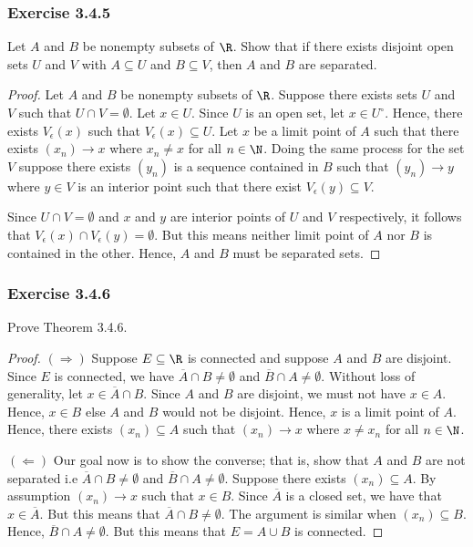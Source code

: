 \subsubsection{Exercise 3.4.5} 
Let \( A  \) and \( B  \) be nonempty subsets of \( \R  \). Show that if there exists disjoint open sets \( U  \) and \( V  \) with \( A \subseteq U  \) and \( B \subseteq V  \), then \( A  \) and \( B  \) are separated.

\begin{proof}
    Let \( A  \) and \( B  \) be nonempty subsets of \( \R  \). Suppose there exists sets \( U \) and \( V  \) such that \( U \cap V = \emptyset \). Let \( x  \in U \). Since \( U \) is an open set, let \( x \in U^{\circ} \). Hence,  there exists \( V_{\epsilon }(x) \) such that \( V_{\epsilon }(x) \subseteq U  \). Let \( x  \) be a limit point of \( A  \) such that there exists \( (x_n) \to x  \) where \( x_n \neq x  \) for all \( n \in \N  \). Doing the same process for the set \( V \) suppose there exists \( (y_n)  \) is a sequence contained in \( B  \) such that \( (y_n) \to y  \) where \( y \in V  \) is an interior point such that there exist \( V_{\epsilon }(y) \subseteq V  \).

    Since \( U \cap V = \emptyset \) and \( x  \) and \( y \) are interior points of \( U \) and \( V  \) respectively, it follows that \( V_{\epsilon }(x) \cap V_{\epsilon }(y) = \emptyset \). But this means neither limit point of \(A \) nor \( B \) is contained in the other. Hence, \( A  \) and \( B  \) must be separated sets.
\end{proof}





\subsubsection{Exercise 3.4.6} Prove Theorem 3.4.6.
\begin{proof}
    \( (\Rightarrow) \) Suppose \( E \subseteq \R  \) is connected and suppose \( A  \) and \( B \) are disjoint. Since \( E  \) is connected, we have \( \overline{A} \cap B \neq \emptyset \) and \( \overline{B} \cap A \neq \emptyset \). Without loss of generality, let \( x \in \overline{A}  \cap B  \). Since \( A  \) and \( B  \) are disjoint, we must not have \( x \in A   \). Hence, \( x \in B  \) else \( A  \) and \( B  \) would not be disjoint. Hence, \( x  \) is a limit point of \( A  \). Hence, there exists \( (x_n) \subseteq A  \) such that \( (x_n) \to x  \) where \( x \neq x_n \) for all \( n \in \N \).  

\( (\Leftarrow) \) Our goal now is to show the converse; that is, show that \( A  \) and \( B \) are not separated i.e \( \overline{A} \cap B \neq \emptyset \) and \( \overline{B} \cap A \neq \emptyset \). Suppose there exists \( (x_n) \subseteq A \). By assumption \( (x_n) \to x  \) such that \( x \in B  \). Since \( \overline{A}  \) is a closed set, we have that \( x \in \overline{A} \). But this means that \( \overline{A} \cap B \neq \emptyset\). The argument is similar when \( (x_n) \subseteq B  \). Hence, \( \overline{B} \cap A \neq \emptyset \). But this means that \( E = A \cup B  \) is connected.
\end{proof}

